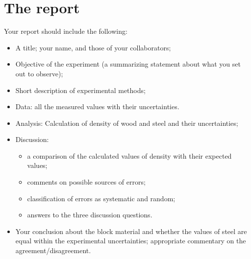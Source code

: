 \section{The report}
Your report should include the following:
\begin{itemize}
\item
A title; your name, and those of your collaborators;
\item
Objective of the experiment (a summarizing statement about what you set out to observe);
\item Short description of experimental methods;
\item
Data: all the measured values with their uncertainties.
\item
Analysis: Calculation of density of wood and steel and their uncertainties;
\item
Discussion: 
\begin{itemize}
\item a comparison of the calculated values of density with their expected values;
\item comments on possible sources of errors;
\item classification of errors as systematic and random;
\item answers to the three discussion questions.
\end{itemize}
\item
Your conclusion about the block material and whether the values of steel are equal within the experimental uncertainties; appropriate commentary on the agreement/disagreement.
\end{itemize}

\AtEndDocument{\clearpage\ifodd\value{page}\else\null\clearpage\fi} %


